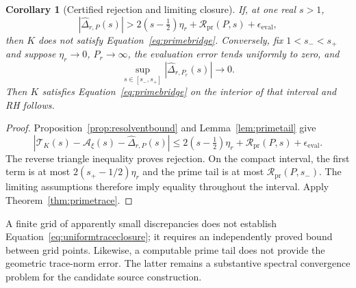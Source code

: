 \documentclass[11pt,letterpaper]{article}
\numberwithin{equation}{section}
\newtheorem{corollary}[theorem]{Corollary}
\theoremstyle{definition}
\theoremstyle{remark}
\begin{document}
\begin{corollary}[Certified rejection and limiting closure]
\label{cor:certifiedtrace}
If, at one real $s>1$,
\begin{equation}
 |\widehat\Delta_{r,P}(s)|>
 2(s-\tfrac12)\eta_r+\mathcal R_{\mathrm{pr}}(P,s)
 +\epsilon_{\mathrm{eval}},
 \label{eq:tracerejection}
\end{equation}
then $K$ does not satisfy Equation~\eqref{eq:primebridge}. Conversely, fix $1<s_-<s_+$ and suppose $\eta_r\to0$, $P_r\to\infty$, the evaluation error tends uniformly to zero, and
\begin{equation}
 \sup_{s\in[s_-,s_+]}|\widehat\Delta_{r,P_r}(s)|\longrightarrow0.
 \label{eq:uniformtraceclosure}
\end{equation}
Then $K$ satisfies Equation~\eqref{eq:primebridge} on the interior of that interval and RH follows.
\end{corollary}
\begin{proof}
Proposition~\ref{prop:resolventbound} and Lemma~\ref{lem:primetail} give
\begin{equation}
 \left|\mathcal T_K(s)-\mathcal A_\xi(s)
                   -\widehat\Delta_{r,P}(s)\right|
 \leq2(s-\tfrac12)\eta_r+\mathcal R_{\mathrm{pr}}(P,s)
       +\epsilon_{\mathrm{eval}}.
 \label{eq:totaltraceerror}
\end{equation}
The reverse triangle inequality proves rejection. On the compact interval, the first term is at most $2(s_+-1/2)\eta_r$ and the prime tail is at most $\mathcal R_{\mathrm{pr}}(P,s_-)$. The limiting assumptions therefore imply equality throughout the interval. Apply Theorem~\ref{thm:primetrace}.
\end{proof}

A finite grid of apparently small discrepancies does not establish Equation~\eqref{eq:uniformtraceclosure}; it requires an independently proved bound between grid points. Likewise, a computable prime tail does not provide the geometric trace-norm error. The latter remains a substantive spectral convergence problem for the candidate source construction.
\end{document}
